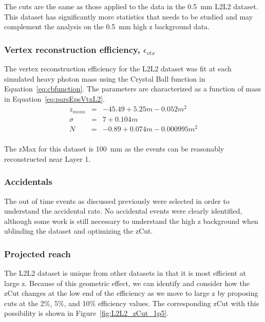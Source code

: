 The cuts are the same as those applied to the data in the 0.5~mm L2L2 dataset. This dataset has significantly more statistics that needs to be studied and may complement the analysis on the 0.5~mm high z background data. 

\subsubsection{Vertex reconstruction efficiency, $\epsilon_{vtx}$}
The vertex reconstruction efficiency for the L2L2 dataset was fit at each simulated heavy photon mass using the Crystal Ball function in Equation~\eqref{eq:cbfunction}. The parameters are characterized as a function of mass in Equation~\eqref{eq:parsEpsVtxL2}.
\begin{eqnarray*}
\label{eq:parsEpsVtxL2}
z_{mean} & = & -45.49+5.25m-0.052m^2 \\
\sigma & = & 7+0.104m \\
N & = & -0.89+0.074m-0.000995m^2 \\
\end{eqnarray*}

The zMax for this dataset is 100~mm as the events can be reasonably reconstructed near Layer 1.

\subsubsection{Accidentals}

The out of time events as discussed previously were selected in order to understand the accidental rate. No accidental events were clearly identified, although some work is still necessary to understand the high z background when ublinding the dataset and optimizing the zCut. 

\subsubsection{Projected reach}
The L2L2 dataset is unique from other datasets in that it is most efficient at large z. Because of this geometric effect, we can identify and consider how the zCut changes at the low end of the efficiency as we move to large z by proposing cuts at the 2$\%$, 5$\%$, and 10$\%$ efficiency values. The corresponding zCut with this possibility is shown in Figure~\ref{fig:L2L2_zCut_1p5}.

